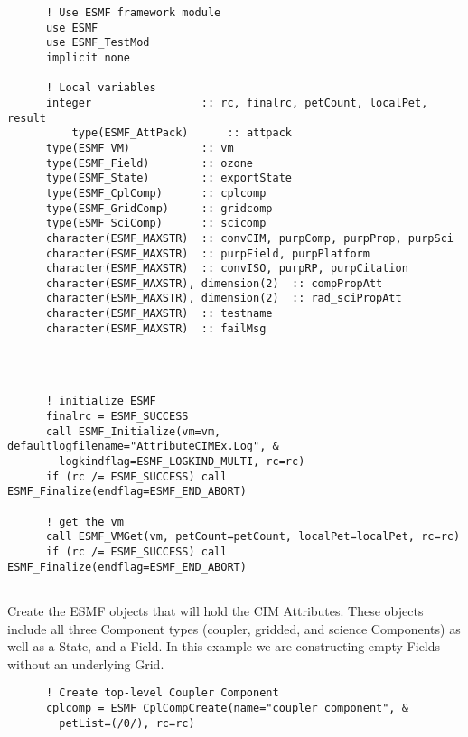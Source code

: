  \begin{verbatim}
      ! Use ESMF framework module
      use ESMF
      use ESMF_TestMod
      implicit none

      ! Local variables
      integer                 :: rc, finalrc, petCount, localPet, result
          type(ESMF_AttPack)      :: attpack
      type(ESMF_VM)           :: vm
      type(ESMF_Field)        :: ozone
      type(ESMF_State)        :: exportState
      type(ESMF_CplComp)      :: cplcomp
      type(ESMF_GridComp)     :: gridcomp
      type(ESMF_SciComp)      :: scicomp
      character(ESMF_MAXSTR)  :: convCIM, purpComp, purpProp, purpSci
      character(ESMF_MAXSTR)  :: purpField, purpPlatform
      character(ESMF_MAXSTR)  :: convISO, purpRP, purpCitation
      character(ESMF_MAXSTR), dimension(2)  :: compPropAtt
      character(ESMF_MAXSTR), dimension(2)  :: rad_sciPropAtt
      character(ESMF_MAXSTR)  :: testname
      character(ESMF_MAXSTR)  :: failMsg
 
\end{verbatim}
 

 \begin{verbatim}


      ! initialize ESMF
      finalrc = ESMF_SUCCESS
      call ESMF_Initialize(vm=vm, defaultlogfilename="AttributeCIMEx.Log", &
        logkindflag=ESMF_LOGKIND_MULTI, rc=rc)
      if (rc /= ESMF_SUCCESS) call ESMF_Finalize(endflag=ESMF_END_ABORT)

      ! get the vm
      call ESMF_VMGet(vm, petCount=petCount, localPet=localPet, rc=rc)
      if (rc /= ESMF_SUCCESS) call ESMF_Finalize(endflag=ESMF_END_ABORT)
 
\end{verbatim}
 

  \begin{sloppypar}
      Create the ESMF objects that will hold the CIM Attributes.
      These objects include all three Component types (coupler, gridded,
      and science Components) as well as a State, and a Field.
      In this example we are constructing empty Fields without an
      underlying Grid.
  \end{sloppypar} 

 \begin{verbatim}
      ! Create top-level Coupler Component
      cplcomp = ESMF_CplCompCreate(name="coupler_component", &
        petList=(/0/), rc=rc)

 
\end{verbatim}
 
